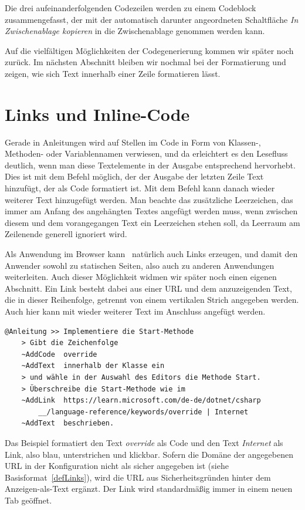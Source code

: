 Die drei aufeinanderfolgenden Codezeilen werden zu einem Codeblock zusammengefasst, der mit der automatisch darunter angeordneten Schaltfläche \emph{In Zwischenablage kopieren} in die Zwischenablage genommen werden kann.

Auf die vielfältigen Möglichkeiten der Codegenerierung kommen wir später noch zurück. Im nächsten Abschnitt bleiben wir nochmal bei der Formatierung und zeigen, wie sich Text innerhalb einer Zeile formatieren lässt.

\section{Links und Inline-Code}\label{LinksInline}
Gerade in Anleitungen wird auf Stellen im Code in Form von Klassen-, Methoden- oder Variablennamen verwiesen, und da erleichtert es den Lesefluss deutlich, wenn man diese Textelemente in der Ausgabe entsprechend hervorhebt. Dies ist mit dem Befehl  möglich, der der Ausgabe der letzten Zeile Text hinzufügt, der als Code formatiert ist. Mit dem Befehl  kann danach wieder weiterer Text hinzugefügt werden. Man beachte das zusätzliche Leerzeichen, das immer am Anfang des angehängten Textes angefügt werden muss, wenn zwischen diesem und dem vorangegangen Text ein Leerzeichen stehen soll, da Leerraum am Zeilenende generell ignoriert wird.

Als Anwendung im Browser kann \FPZ\ natürlich auch Links erzeugen, und damit den Anwender sowohl zu statischen Seiten, also auch zu anderen Anwendungen weiterleiten. Auch dieser Möglichkeit widmen wir später noch einen eigenen Abschnitt. Ein Link besteht dabei aus einer URL und dem anzuzeigenden Text, die in dieser Reihenfolge, getrennt von einem vertikalen Strich angegeben werden. Auch hier kann mit  wieder weiterer Text im Anschluss angefügt werden.

\label{BspLinksUndInlineCode}
\begin{verbatim}
@Anleitung >> Implementiere die Start-Methode
    > Gibt die Zeichenfolge 
    ~AddCode  override 
    ~AddText  innerhalb der Klasse ein
    > und wähle in der Auswahl des Editors die Methode Start.
    > Überschreibe die Start-Methode wie im
    ~AddLink  https://learn.microsoft.com/de-de/dotnet/csharp
        __/language-reference/keywords/override | Internet
    ~AddText  beschrieben.
\end{verbatim}

Das Beispiel formatiert den Text \emph{override} als Code und den Text \emph{Internet} als Link, also blau, unterstrichen und klickbar. Sofern die Domäne der angegebenen URL in der Konfiguration nicht als sicher angegeben ist (siehe Basisformat~\ref{defLinks}), wird die URL aus Sicherheitsgründen hinter dem Anzeigen-als-Text ergänzt. Der Link wird standardmäßig immer in einem neuen Tab geöffnet.

